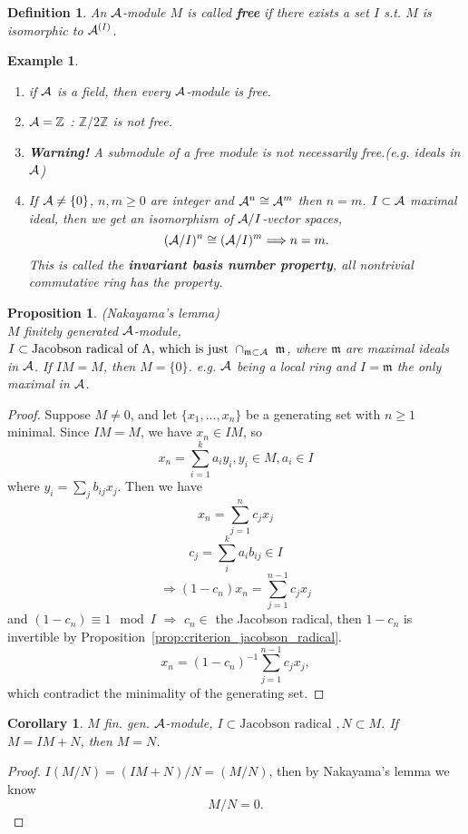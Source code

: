 \documentclass[11pt]{article}
\newtheorem{prop}[thm]{Proposition}
\newtheorem{cor}[thm]{Corollary}
\newtheorem{dfn}[thm]{Definition}
\newtheorem{ex}[thm]{Example}
\newcommand{\intg}{\mathbb Z}
\newcommand{\scm}{{\mathfrak m}}
\newcommand{\cala}{{\cal A}}
\newcommand{\Lrta}{\Longrightarrow}
\begin{document}
\begin{dfn}
An $\cala$-module $M$ is called \textbf{free} if there exists a set $I$ s.t. $M$ is isomorphic to $\cala^{(I)}$.
\end{dfn}
\begin{ex}\ 
\begin{enumerate}
\item if $\cala$ is a field, then every $\cala$-module is free.
\item $\cala=\intg$ : $\intg/2\intg$ is not free.
\item \textbf{Warning!} A submodule of a free module is not necessarily free.(e.g. ideals in $\cala$)
\item If $\cala\neq \{0\}$, $n,m\geq 0$ are integer and $\cala^n\cong \cala^m$ then $n=m$.
$I\subset \cala$ maximal ideal, then we get an isomorphism of $\cala/I$-vector spaces,
$$
(\cala/I)^n\cong(\cala/I)^m\Lrta n=m.
$$
This is called the \textbf{invariant basis number property}, all nontrivial commutative ring has the property. 
\end{enumerate}
\end{ex}

\begin{prop}
(Nakayama's lemma)\\
$M$ finitely generated $\cala$-module, $I\subset \text{Jacobson radical of \cala, which is just } \cap_{\scm\subset\cala\ }\scm$, where $\scm $ are maximal ideals in $\cala$.
If $IM=M$, then $M=\{0\}$. e.g. 
$\cala$ being a local ring and $I=\scm$ the only maximal in $\cala$.
\end{prop}

\begin{proof}
Suppose $M\neq {0}$, and let $\{x_1,...,x_n\}$ be a generating set with $n\geq1$ minimal.
Since $IM=M$, we have $x_n\in IM$, so
$$
x_n=\sum_{i=1}^k
a_i y_i, y_i\in M, a_i\in I
$$
where $y_i=\sum_j b_{ij }x_j$.
Then we have 
$$
x_n=\sum_{j=1}^n c_j x_j
$$
$$
c_j=\sum_i^k a_i b_{ij}\in I
$$
$$
\Lrta (1-c_n)x_n=\sum_{j=1}^{n-1}c_j x_j
$$ 
and
$(1-c_n)\equiv 1\mod I$ $\Lrta$ $c_n\in$ the Jacobson radical, then  $1-c_n$ is invertible by Proposition~\ref{prop:criterion_jacobson_radical}.
$$
x_n=(1-c_n)^{-1}\sum_{j=1}^{n-1}c_j x_j,
$$ 
which contradict the minimality of the generating set.
\end{proof}

\begin{cor}
$M$ fin. gen. $\cala$-module, $I \subset \text{Jacobson radical }, N\subset M$. If $M=IM +N$, then $M=N$.
\end{cor}
\begin{proof}
$I(M/N)=(IM+N)/N=(M/N)$, then by Nakayama's lemma we know 
$$
M/N={0}.
$$
\end{proof}
\end{document}
